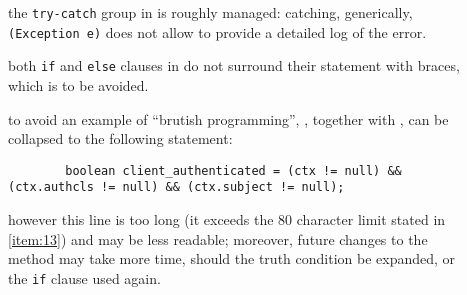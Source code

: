 
\begin{description}
	
	\item []
		the \verb|try-catch| group in  is roughly managed: catching, generically, \verb|(Exception e)| does not allow to provide a detailed log of the error.

\end{description}



\begin{description}
	
	\item [] 
		both \verb|if| and \verb|else| clauses in  do not surround their statement with braces, which is to be avoided.
	
	\item []
		to avoid an example of ``brutish programming'', , together with , can be collapsed to the following statement: 
		\begin{verbatim}
		boolean client_authenticated = (ctx != null) && (ctx.authcls != null) && (ctx.subject != null);
		\end{verbatim}
		however this line is too long (it exceeds the 80 character limit stated in \cref{item:13}) and may be less readable; moreover, future changes to the method may take more time, should the truth condition be expanded, or the \verb|if| clause used again.
\end{description}


